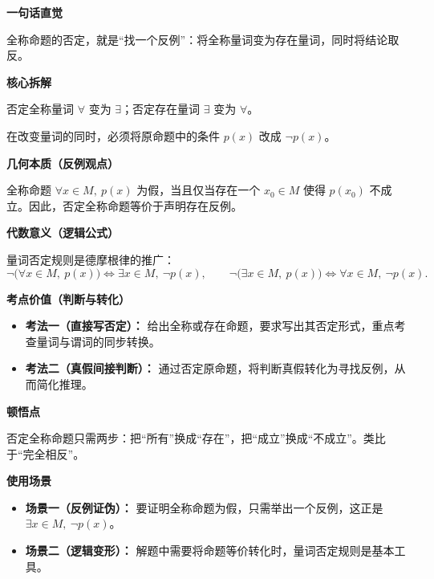 \begin{explanationbox}
	\textbf{\textcolor{CExplanation}{一句话直觉}}

	全称命题的否定，就是“找一个反例”：将全称量词变为存在量词，同时将结论取反。

	\medskip
	\textbf{\textcolor{CExplanation}{核心拆解}}
	\begin{description}[style=nextline, leftmargin=2.8em, labelsep=0.5em, itemsep=0.45em]
		\item[\textbf{要点一（量词互换）：}] 否定全称量词 $\forall$ 变为 $\exists$；否定存在量词 $\exists$ 变为 $\forall$。
		\item[\textbf{要点二（谓词取反）：}] 在改变量词的同时，必须将原命题中的条件 $p(x)$ 改成 $\neg p(x)$。
	\end{description}

	\medskip
	\textbf{\textcolor{CExplanation}{几何本质（反例观点）}}

	全称命题 $\forall x\in M,\ p(x)$ 为假，当且仅当存在一个 $x_0\in M$ 使得 $p(x_0)$ 不成立。因此，否定全称命题等价于声明存在反例。

	\medskip
	\textbf{\textcolor{CExplanation}{代数意义（逻辑公式）}}

	量词否定规则是德摩根律的推广：
	\[
		\neg\big(\forall x\in M,\ p(x)\big) \iff \exists x\in M,\ \neg p(x),
		\qquad
		\neg\big(\exists x\in M,\ p(x)\big) \iff \forall x\in M,\ \neg p(x).
	\]

	\medskip
	\textbf{\textcolor{CExplanation}{考点价值（判断与转化）}}
	\begin{itemize}[leftmargin=*, itemsep=0.5em, topsep=0.4em]
		\item \textbf{考法一（直接写否定）：} 给出全称或存在命题，要求写出其否定形式，重点考查量词与谓词的同步转换。
		\item \textbf{考法二（真假间接判断）：} 通过否定原命题，将判断真假转化为寻找反例，从而简化推理。
	\end{itemize}

	\medskip
	\textbf{\textcolor{CExplanation}{顿悟点}}

	否定全称命题只需两步：把“所有”换成“存在”，把“成立”换成“不成立”。类比于“完全相反”。

	\medskip
	\textbf{\textcolor{CExplanation}{使用场景}}
	\begin{itemize}[leftmargin=*, itemsep=0.5em, topsep=0.4em]
		\item \textbf{场景一（反例证伪）：} 要证明全称命题为假，只需举出一个反例，这正是 $\exists x\in M,\ \neg p(x)$。
		\item \textbf{场景二（逻辑变形）：} 解题中需要将命题等价转化时，量词否定规则是基本工具。
	\end{itemize}
\end{explanationbox}
